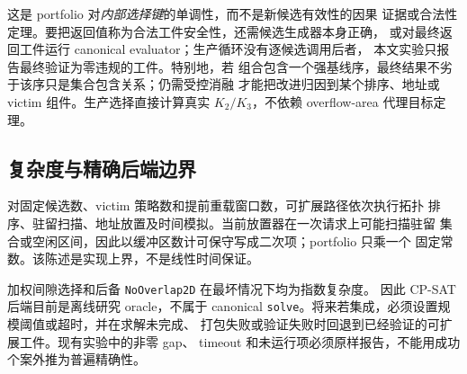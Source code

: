 这是 portfolio 对\emph{内部选择键}的单调性，而不是新候选有效性的因果
证据或合法性定理。要把返回值称为合法工件安全性，还需候选生成器本身正确，
或对最终返回工件运行 canonical evaluator；生产循环没有逐候选调用后者，
本文实验只报告最终验证为零违规的工件。特别地，若
组合包含一个强基线序，最终结果不劣于该序只是集合包含关系；仍需受控消融
才能把改进归因到某个排序、地址或 victim 组件。生产选择直接计算真实
$K_2/K_3$，不依赖 overflow-area 代理目标定理。

\subsection{复杂度与精确后端边界}

对固定候选数、victim 策略数和提前重载窗口数，可扩展路径依次执行拓扑
排序、驻留扫描、地址放置及时间模拟。当前放置器在一次请求上可能扫描驻留
集合或空闲区间，因此以缓冲区数计可保守写成二次项；portfolio 只乘一个
固定常数。该陈述是实现上界，不是线性时间保证。

加权间隙选择和后备 \texttt{NoOverlap2D} 在最坏情况下均为指数复杂度。
因此 CP-SAT 后端目前是离线研究 oracle，不属于 canonical
\texttt{solve}。将来若集成，必须设置规模阈值或超时，并在求解未完成、
打包失败或验证失败时回退到已经验证的可扩展工件。现有实验中的非零 gap、
timeout 和未运行项必须原样报告，不能用成功个案外推为普遍精确性。
